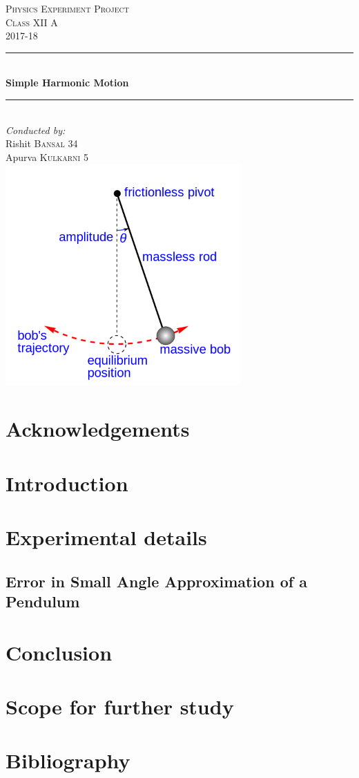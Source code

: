 \documentclass[12pt]{report}
\numberwithin{equation}{section}
\begin{document}
\begin{titlepage}
  
\newcommand{\HRule}{\rule{\linewidth}{0.5mm}}

\center
\vspace*{3cm} 

\textsc{\LARGE Physics Experiment Project}\\[1.5cm]
\textsc{\Large Class XII A}\\[0.5cm]
\textsc{\large 2017-18}\\[0.5cm]


\HRule \\[0.4cm]
{ \huge \bfseries Simple Harmonic Motion}\\[0.4cm]
\HRule \\[1.5cm]
 

\Large \emph{Conducted by:}\\
\large Rishit \textsc{Bansal 34}\\
\large Apurva \textsc{Kulkarni 5}\\[2cm]

\includegraphics[width=9cm]{title2}
\vfill

\end{titlepage}

\chapter{Acknowledgements}

\tableofcontents
\chapter{Introduction}

\chapter{Experimental details}
\section{Error in Small Angle Approximation of a Pendulum}

\chapter{Conclusion}

\chapter{Scope for further study}

\chapter{Bibliography}

\end{document}
